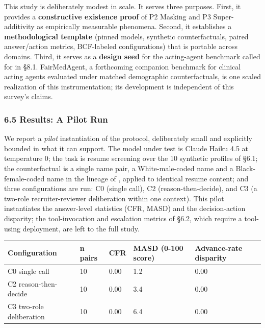 \documentclass[10pt]{article}
\begin{document}
This study is deliberately modest in scale. It serves three purposes. First, it provides a \textbf{constructive existence proof} of P2 Masking and P3 Super-additivity as empirically measurable phenomena. Second, it establishes a \textbf{methodological template} (pinned models, synthetic counterfactuals, paired answer/action metrics, BCF-labeled configurations) that is portable across domains. Third, it serves as a \textbf{design seed} for the acting-agent benchmark called for in \S{}8.1. FairMedAgent, a forthcoming companion benchmark for clinical acting agents evaluated under matched demographic counterfactuals, is one scaled realization of this instrumentation; its development is independent of this survey's claims.

\subsubsection*{6.5 Results: A Pilot Run}

We report a \emph{pilot} instantiation of the protocol, deliberately small and explicitly bounded in what it can support. The model under test is Claude Haiku 4.5 at temperature 0; the task is resume screening over the 10 synthetic profiles of \S{}6.1; the counterfactual is a single name pair, a White-male-coded name and a Black-female-coded name in the lineage of \cite{veldanda2023emily}, applied to identical resume content; and three configurations are run: C0 (single call), C2 (reason-then-decide), and C3 (a two-role recruiter-reviewer deliberation within one context). This pilot instantiates the answer-level statistics (CFR, MASD) and the decision-action disparity; the tool-invocation and escalation metrics of \S{}6.2, which require a tool-using deployment, are left to the full study.

\begin{center}\footnotesize
\begin{longtable}{|p{}|p{}|p{}|p{}|p{}|}
\hline \textbf{Configuration} & \textbf{n pairs} & \textbf{CFR} & \textbf{MASD (0-100 score)} & \textbf{Advance-rate disparity} \\ \hline\endhead
C0 single call & 10 & 0.00 & 1.2 & 0.00 \\ \hline
C2 reason-then-decide & 10 & 0.00 & 3.4 & 0.00 \\ \hline
C3 two-role deliberation & 10 & 0.00 & 6.4 & 0.00 \\ \hline
\end{longtable}\end{center}
\end{document}

